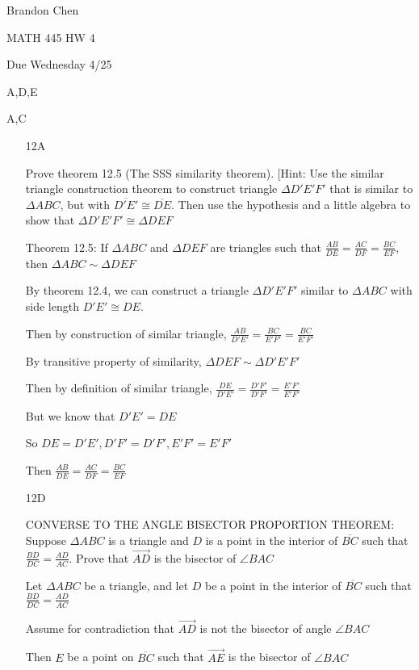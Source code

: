 \documentclass[11pt]{article}
\newcommand{\ray}[1]{\overrightarrow{#1}}
\newcommand{\segment}[1]{\overline{#1}}
\begin{document}
\noindent Brandon Chen

\noindent MATH 445 HW 4

\noindent Due Wednesday 4/25

 A,D,E

 A,C

\begin{itemize}

	\item[12A]

		Prove theorem 12.5 (The SSS similarity theorem). [Hint: Use the similar triangle construction theorem to construct triangle $\Delta D'E'F'$ that is similar to $\Delta ABC$, but with $\segment{D'E'} \cong \segment{DE}$. Then use the hypothesis and a little algebra to show that $\Delta D'E'F' \cong \Delta DEF$

	Theorem 12.5: If $\Delta ABC$ and $\Delta DEF$ are triangles such that $\frac{AB}{DE} = \frac{AC}{DF} = \frac{BC}{EF}$, then $\Delta ABC \sim \Delta DEF$

	By theorem 12.4, we can construct a triangle $\Delta D'E'F'$ similar to $\Delta ABC$ with side length $D'E' \cong DE$. 

	Then by construction of similar triangle, $\frac{AB}{D'E'} = \frac{BC}{E'F'} = \frac{BC}{E'F'}$

	By transitive property of similarity, $\Delta DEF \sim \Delta D'E'F'$

	Then by definition of similar triangle, $\frac{DE}{D'E'} = \frac{D'F'}{D'F'} = \frac{E'F'}{E'F'}$

	But we know that $D'E' = DE$

	So $DE = D'E', D'F' = D'F', E'F' = E'F'$

	Then $\frac{AB}{DE} = \frac{AC}{DF} = \frac{BC}{EF}$

	\item[12D]

		CONVERSE TO THE ANGLE BISECTOR PROPORTION THEOREM: Suppose $\Delta ABC$ is a triangle and $D$ is a point in the interior of $\segment{BC}$ such that $\frac{BD}{DC} = \frac{AD}{AC}$. Prove that $\ray{AD}$ is the bisector of $\angle BAC$

		Let $\Delta ABC$ be a triangle, and let $D$ be a point in the interior of $\segment{BC}$ such that $\frac{BD}{DC} = \frac{AD}{AC}$

		Assume for contradiction that $\ray{AD}$ is not the bisector of angle $\angle{BAC}$

		Then $E$ be a point on $\segment{BC}$ such that $\ray{AE}$ is the bisector of $\angle{BAC}$


\end{itemize}
\end{document}
